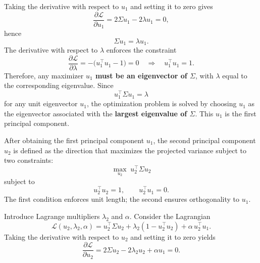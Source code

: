 \documentclass[../main]{subfiles}
\begin{document}
    Taking the derivative with respect to $u_1$ and setting it to zero gives
    \begin{equation}
        \frac{\partial \mathcal{L}}{\partial u_1}
        = 2 \Sigma u_1 - 2 \lambda u_1 = 0,
    \end{equation}
    hence
    \begin{equation}
        \Sigma u_1 = \lambda u_1.
    \end{equation}
    The derivative with respect to $\lambda$ enforces the constraint
    \begin{equation}
        \frac{\partial \mathcal{L}}{\partial \lambda}
        = -\bigl(u_1^\top u_1 - 1\bigr) = 0
        \quad\Longrightarrow\quad
        u_1^\top u_1 = 1.
    \end{equation}
    Therefore, any maximizer \textbf{$u_1$ must be an eigenvector of $\Sigma$}, with $\lambda$ equal to the corresponding eigenvalue.
    Since
    \begin{equation}
        u_1^\top \Sigma u_1 = \lambda
    \end{equation}
    for any unit eigenvector $u_1$, the optimization problem is solved by choosing $u_1$ as the eigenvector associated with the \textbf{largest eigenvalue of $\Sigma$}.  
    This $u_1$ is the first principal component.

    After obtaining the first principal component $u_1$, the second principal component $u_2$ is defined as the direction that maximizes the projected variance subject to two constraints:
\begin{equation}
    \max_{u_2}\; u_2^\top \Sigma u_2
\end{equation}
subject to
\begin{equation}
    u_2^\top u_2 = 1,
    \qquad
    u_2^\top u_1 = 0.
\end{equation}
The first condition enforces unit length; the second ensures orthogonality to $u_1$.

Introduce Lagrange multipliers $\lambda_2$ and $\alpha$.  
Consider the Lagrangian
\begin{equation}
\mathcal{L}(u_2,\lambda_2,\alpha)
    = u_2^\top \Sigma u_2
      + \lambda_2 (1 - u_2^\top u_2)
      + \alpha\, u_2^\top u_1.
\end{equation}
Taking the derivative with respect to $u_2$ and setting it to zero yields
\begin{equation}
    \frac{\partial \mathcal{L}}{\partial u_2}
    = 2 \Sigma u_2 - 2 \lambda_2 u_2 + \alpha u_1 = 0.
\end{equation}
\end{document}
